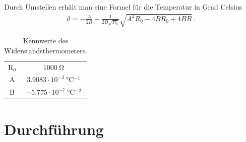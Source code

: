 \documentclass[12pt,a4paper,titlepage,headinclude,bibtotoc]{scrartcl}
\numberwithin{equation}{subsection}
\begin{document}
Durch Umstellen erhält man eine Formel für die Temperatur in Grad Celsius
\begin{align}
 \vartheta = -\frac{A}{2 B} - \frac{1}{2 B \sqrt{R_0}} \sqrt{A^2 R_0  - 4 B R_0 + 4 B R    }\label{eq:temperapt1000}~.
\end{align}

\begin{table}[!htb]
	\centering
	\begin{tabular}{|c|c|}
		\hline
		R$_0$ & $1000 ~ \si{\ohm}$\\
		A   & $3.9083 \cdot 10^{-3} ~ \si{\celsius^{-1}}$\\
		B   & $-5.775 \cdot 10^{-7} ~ \si{\celsius^{-2}}$\\
		\hline
	\end{tabular}
	\caption{Kennwerte des Widerstandsthermometers.}
	\label{tab:Pt1000}
\end{table}
\newpage
\section{Durchführung}
\label{sec:durchfuehrung}
\end{document}
